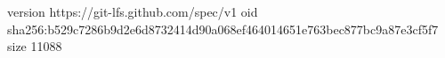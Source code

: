 version https://git-lfs.github.com/spec/v1
oid sha256:b529c7286b9d2e6d8732414d90a068ef464014651e763bec877bc9a87e3cf5f7
size 11088
